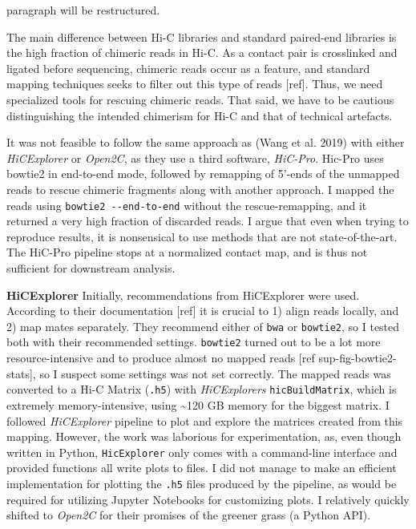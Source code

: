 \documentclass[
  11pt,
  a4paper,
]{scrbook}
\let\oldemph\emph
\renewcommand\emph[1]{\oldemph{\color{gray}#1}}
\begin{document}
paragraph will be restructured.

The main difference between Hi-C libraries and standard paired-end
libraries is the high fraction of chimeric reads in Hi-C. As a contact
pair is crosslinked and ligated before sequencing, chimeric reads occur
as a feature, and standard mapping techniques seeks to filter out this
type of reads {[}ref{]}. Thus, we need specialized tools for rescuing
chimeric reads. That said, we have to be cautious distinguishing the
intended chimerism for Hi-C and that of technical artefacts.

It was not feasible to follow the same approach as (Wang et al. 2019)
with either \emph{HiCExplorer} or \emph{Open2C}, as they use a third
software, \emph{HiC-Pro}. Hic-Pro uses bowtie2 in end-to-end mode,
followed by remapping of 5'-ends of the unmapped reads to rescue
chimeric fragments along with another approach. I mapped the reads using
\texttt{bowtie2\ -\/-end-to-end} without the rescue-remapping, and it
returned a very high fraction of discarded reads. I argue that even when
trying to reproduce results, it is nonsensical to use methods that are
not state-of-the-art. The HiC-Pro pipeline stops at a normalized contact
map, and is thus not sufficient for downstream analysis.

\textbf{HiCExplorer} Initially, recommendations from HiCExplorer were
used. According to their documentation {[}ref{]} it is crucial to 1)
align reads locally, and 2) map mates separately. They recommend either
of \texttt{bwa} or \texttt{bowtie2}, so I tested both with their
recommended settings. \texttt{bowtie2} turned out to be a lot more
resource-intensive and to produce almost no mapped reads {[}ref
sup-fig-bowtie2-stats{]}, so I suspect some settings was not set
correctly. The mapped reads was converted to a Hi-C Matrix
(\texttt{.h5}) with \emph{HiCExplorers} \texttt{hicBuildMatrix}, which
is extremely memory-intensive, using \textasciitilde120 GB memory for
the biggest matrix. I followed \emph{HiCExplorer} pipeline to plot and
explore the matrices created from this mapping. However, the work was
laborious for experimentation, as, even though written in Python,
\texttt{HicExplorer} only comes with a command-line interface and
provided functions all write plots to files. I did not manage to make an
efficient implementation for plotting the \texttt{.h5} files produced by
the pipeline, as would be required for utilizing Jupyter Notebooks for
customizing plots. I relatively quickly shifted to \emph{Open2C} for
their promises of the greener grass (a Python API).
\end{document}
